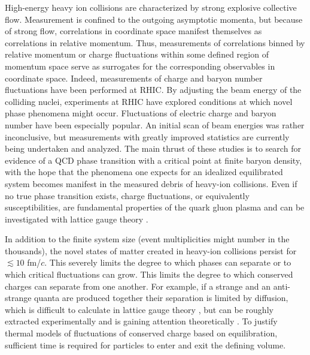 High-energy heavy ion collisions are characterized by strong explosive collective flow. Measurement is confined to the outgoing asymptotic momenta, but because of strong flow, correlations in coordinate space manifest themselves as correlations in relative momentum. Thus, measurements of correlations binned by relative momentum or charge fluctuations within some defined region of momentum space serve as surrogates for the corresponding observables in coordinate space. Indeed, measurements of charge and baryon number fluctuations have been performed at RHIC. By adjusting the beam energy of the colliding nuclei, experiments at RHIC have explored conditions at which novel phase phenomena might occur. Fluctuations of electric charge and baryon number have been especially popular. An initial scan of beam energies \cite{Abelev:2008jg,Sarkar:2014fja,Xu:2016hxf,Thader:2016gpa,Luo:2012kja,Tarnowsky:2011vk,Aggarwal:2010wy,Chatterjee:2019msq,Adam:2019xmk,Adamczyk:2014fia,Sarkar:2013qla,Luo:2013saa,Sahoo:2012pfx,Luo:2011ts,Sahoo:2011at,R.Sahoo:2011qtk,Nayak:2009wc,McDonald:2012ts,McDonald:2013aoa} was rather inconclusive, but measurements with greatly improved statistics are currently being undertaken and analyzed. The main thrust of these studies is to search for evidence of a QCD phase transition with a critical point at finite baryon density, with the hope that the phenomena one expects for an idealized equilibrated system \cite{Stephanov:1998dy,Stephanov:1999zu} becomes manifest in the measured debris of heavy-ion collisions. Even if no true phase transition exists, charge fluctuations, or equivalently susceptibilities, are fundamental properties of the quark gluon plasma and can be investigated with lattice gauge theory \cite{Borsanyi:2011sw}.

In addition to the finite system size (event multiplicities might number in the thousands), the novel states of matter created in heavy-ion collisions persist for $\lesssim 10$ fm/$c$. This severely limits the degree to which phases can separate or to which critical fluctuations can grow. This limits the degree to which conserved charges can separate from one another. For example, if a strange and an anti-strange quanta are produced together their separation is limited by diffusion, which is difficult to calculate in lattice gauge theory \cite{Aarts:2014nba,Amato:2013naa}, but can be roughly extracted experimentally and is gaining attention theoretically \cite{Aziz:2004qu,Kapusta:2014dja,Kapusta:2017hfi,Hammelmann:2018ath}. To justify thermal models of fluctuations of conserved charge based on equilibration, sufficient time is required for particles to enter and exit the defining volume.

